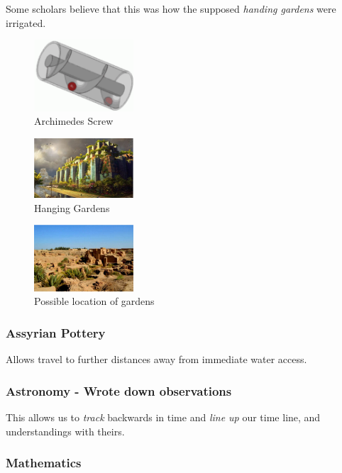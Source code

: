 \documentclass[11pt]{article}
\begin{document}
Some scholars believe that this was how the supposed \emph{handing gardens} were irrigated.
\begin{figure}[htb]
\centering
\includegraphics[width=10em]{./img/archScrew.png}
\caption{Archimedes Screw}
\end{figure}

\begin{figure}[htb]
\centering
\includegraphics[width=10em]{./img/HangingGardens.png}
\caption{Hanging Gardens}
\end{figure}

\begin{figure}[htb]
\centering
\includegraphics[width=10em]{./img/HangingGardens2.png}
\caption{Possible location of gardens}
\end{figure}


\subsubsection{Assyrian Pottery}
\label{sec-3.8.3}

Allows travel to further distances away from immediate water access.

\subsubsection{Astronomy - Wrote down observations}
\label{sec-3.8.4}

This allows us to \emph{track} backwards in time and \emph{line up} our time line, and understandings with theirs.

\subsubsection{Mathematics}
\label{sec-3.8.5}
\end{document}
